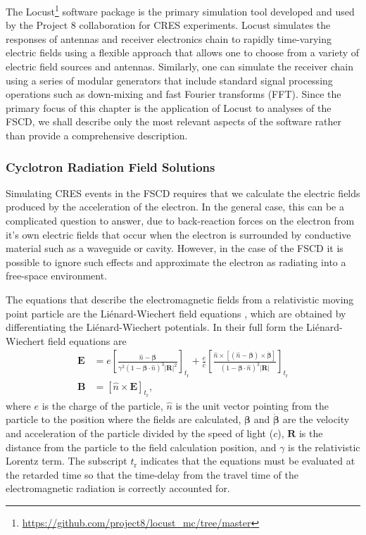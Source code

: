 The Locust\footnote{\url{https://github.com/project8/locust_mc/tree/master}} software package \cite{p8locustpaper} is the primary simulation tool developed and used by the Project 8 collaboration for CRES experiments. Locust simulates the responses of antennas and receiver electronics chain to rapidly time-varying electric fields using a flexible approach that allows one to choose from a variety of electric field sources and antennas. Similarly, one can simulate the receiver chain using a series of modular generators that include standard signal processing operations such as down-mixing and fast Fourier transforms (FFT). Since the primary focus of this chapter is the application of Locust to analyses of the FSCD, we shall describe only the most relevant aspects of the software rather than provide a comprehensive description.

\subsubsection*{Cyclotron Radiation Field Solutions}

Simulating CRES events in the FSCD requires that we calculate the electric fields produced by the acceleration of the electron. In the general case, this can be a complicated question to answer, due to back-reaction forces on the electron from it's own electric fields that occur when the electron is surrounded by conductive material such as a waveguide or cavity. However, in the case of the FSCD it is possible to ignore such effects and approximate the electron as radiating into a free-space environment. 

The equations that describe the electromagnetic fields from a relativistic moving point particle are the Li\'{e}nard-Wiechert field equations \cite{lw_potential_1,lw_potential_2}, which are obtained by differentiating the Li\'{e}nard-Wiechert potentials. In their full form the Li\'{e}nard-Wiechert field equations are
\begin{align}
    \bm{E} &=e\left[\frac{\hat{n}-\bm{\beta}}{\gamma^2(1-\bm{\beta}\cdot\hat{n})^3|\bm{R}|^2}\right]_{t_\textrm{r}}
      +\frac{e}{c}\left[\frac{\hat{n}\times[(\hat{n}-\bm{\beta})\times\dot{\bm{\beta}}]}{(1-\bm{\beta}\cdot\hat{n})^3|\bm{R}|}\right]_{t_\textrm{r}}\label{eq:chap4-lw-eqn-efield}\\
    \bm{B} &= \left[\hat{n}\times \bm{E}\right]_{t_\textrm{r}},
\end{align}
where $e$ is the charge of the particle, $\hat{n}$ is the unit vector pointing from the particle to the position where the fields are calculated, $\bm{\beta}$ and $\dot{\bm{\beta}}$ are the velocity and acceleration of the particle divided by the speed of light ($c$), $\bm{R}$ is the distance from the particle to the field calculation position, and $\gamma$ is the relativistic Lorentz term. The subscript $t_\mathrm{r}$ indicates that the equations must be evaluated at the retarded time so that the time-delay from the travel time of the electromagnetic radiation is correctly accounted for. 


